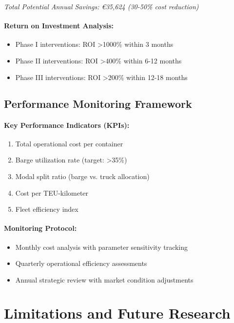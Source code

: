 \documentclass[12pt,a4paper]{article}
\begin{document}
\textit{Total Potential Annual Savings: €35,624 (30-50\% cost reduction)}

\paragraph{Return on Investment Analysis:}
\begin{itemize}
    \item Phase I interventions: ROI >1000\% within 3 months
    \item Phase II interventions: ROI >400\% within 6-12 months
    \item Phase III interventions: ROI >200\% within 12-18 months
\end{itemize}

\subsection{Performance Monitoring Framework}

\paragraph{Key Performance Indicators (KPIs):}
\begin{enumerate}
    \item Total operational cost per container
    \item Barge utilization rate (target: >35\%)
    \item Modal split ratio (barge vs. truck allocation)
    \item Cost per TEU-kilometer
    \item Fleet efficiency index
\end{enumerate}

\paragraph{Monitoring Protocol:}
\begin{itemize}
    \item Monthly cost analysis with parameter sensitivity tracking
    \item Quarterly operational efficiency assessments
    \item Annual strategic review with market condition adjustments
\end{itemize}

\section{Limitations and Future Research}
\end{document}
